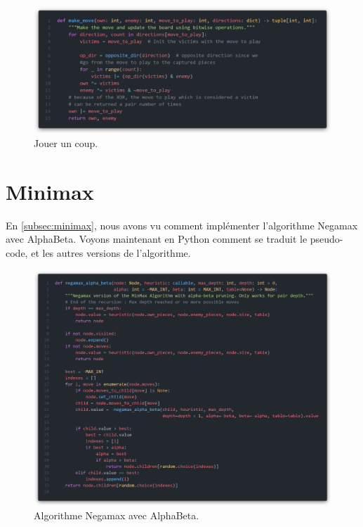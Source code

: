 \begin{figure}[H]
    \centering
    \includegraphics[width=1\textwidth]{ressources/make_move.png}
    \caption{Jouer un coup.}
    \label{fig:make_move}
\end{figure}

\section{Minimax}
\label{app:minimax}

En \ref{subsec:minimax}, nous avons vu comment implémenter l'algorithme Negamax avec AlphaBeta. Voyons maintenant en Python comment se traduit le pseudo-code, et les autres versions de l'algorithme.

\begin{figure}[H]
    \centering
    \includegraphics[width=1\textwidth]{ressources/nega-a-b.png}
    \caption{Algorithme Negamax avec AlphaBeta.}
    \label{fig:negamax-a-b}
\end{figure}